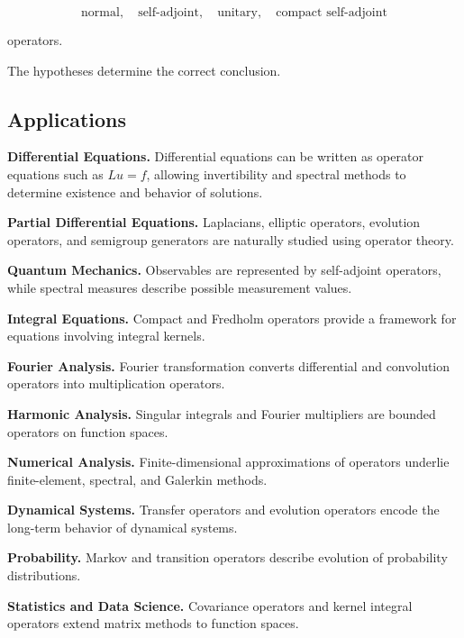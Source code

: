 \[
\boxed{
\text{normal},
\quad
\text{self-adjoint},
\quad
\text{unitary},
\quad
\text{compact self-adjoint}
}
\]

operators.

The hypotheses determine the correct conclusion.

\subsection{Applications}
\label{subsec:operator-theory-applications}

\begin{applicationbox}
\textbf{Differential Equations.}
Differential equations can be written as operator equations such as
\(Lu=f\), allowing invertibility and spectral methods to determine
existence and behavior of solutions.

\medskip

\textbf{Partial Differential Equations.}
Laplacians, elliptic operators, evolution operators, and semigroup
generators are naturally studied using operator theory.

\medskip

\textbf{Quantum Mechanics.}
Observables are represented by self-adjoint operators, while spectral
measures describe possible measurement values.

\medskip

\textbf{Integral Equations.}
Compact and Fredholm operators provide a framework for equations involving
integral kernels.

\medskip

\textbf{Fourier Analysis.}
Fourier transformation converts differential and convolution operators
into multiplication operators.

\medskip

\textbf{Harmonic Analysis.}
Singular integrals and Fourier multipliers are bounded operators on
function spaces.

\medskip

\textbf{Numerical Analysis.}
Finite-dimensional approximations of operators underlie finite-element,
spectral, and Galerkin methods.

\medskip

\textbf{Dynamical Systems.}
Transfer operators and evolution operators encode the long-term behavior
of dynamical systems.

\medskip

\textbf{Probability.}
Markov and transition operators describe evolution of probability
distributions.

\medskip

\textbf{Statistics and Data Science.}
Covariance operators and kernel integral operators extend matrix methods
to function spaces.
\end{applicationbox}

